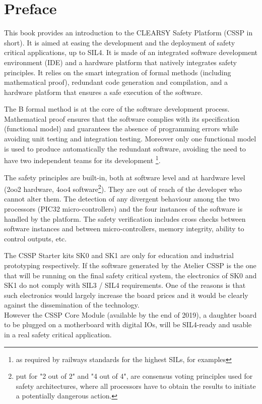 \chapter{Preface}
\label{preface}

This book provides an introduction to the CLEARSY Safety Platform (CSSP in short).
It is aimed at easing the development and the deployment of safety critical applications, up to SIL4. It is made of an integrated software development environment (IDE) and a hardware platform that natively integrates safety principles.
It relies on the smart integration of formal methods (including mathematical proof), redundant code generation and compilation, and a hardware platform that ensures a safe execution of the software.

The B formal method is at the core of the software development process. Mathematical proof ensures that the software complies with its specification (functional model) and guarantees the absence of programming errors while avoiding unit testing and integration testing. Moreover only one functional model is used to produce automatically the redundant software, avoiding the need to have two independent teams for its development \footnote{as required by railways standards for the highest SILs, for examples}.

The safety principles are built-in, both at software level and at hardware level (2oo2 hardware, 4oo4 software\footnote{put for "2 out of 2" and "4 out of 4", are consensus voting principles used for safety architectures, where all processors have to obtain the results to initiate a potentially dangerous action.}). They are out of reach of the developer who cannot alter them. The detection of any divergent behaviour among the two processors (PIC32 micro-controllers) and the four instances of the software is handled by the platform. The safety verification includes cross checks between software instances and between micro-controllers, memory integrity, ability to control outputs, etc. 

\begin{remark}
The CSSP Starter kits SK0 and SK1 are only for education and industrial prototyping respectively. If the software generated by the Atelier CSSP is the one that will be running on the final safety critical system, the electronics of SK0 and SK1 do not comply with SIL3 / SIL4 requirements. One of the reasons is that such electronics would largely increase the board prices and it would be clearly against the dissemination of the technology. \\
However the CSSP Core Module (available by the end of 2019), a daughter board to be plugged on a motherboard with digital IOs, will be SIL4-ready and usable in a real safety critical application.
\end{remark}

